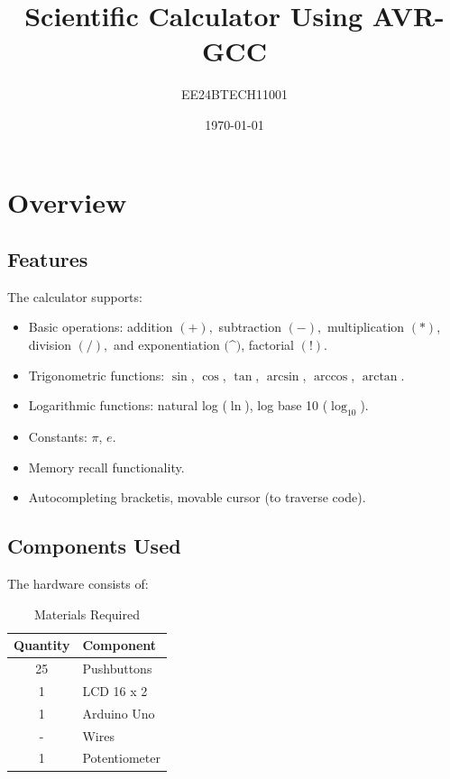 \documentclass[a4paper,12pt]{article}
\title{Scientific Calculator Using AVR-GCC}
\author{EE24BTECH11001}
\date{\today}
\begin{document}
\maketitle


\section{Overview}
\subsection{Features}
The calculator supports:
\begin{itemize}
    \item Basic operations: addition $(+),$ subtraction $(-),$ multiplication $(*)$, division $(/),$ and exponentiation $($\textasciicircum$)$, factorial $(!)$.
    \item Trigonometric functions: $\sin$, $\cos$, $\tan$, $\arcsin$, $\arccos$, $\arctan$.
    \item Logarithmic functions: natural log ($\ln$), log base 10 ($\log_{10}$).
    \item Constants: $\pi$, $e$.
    \item Memory recall functionality.
    \item Autocompleting bracketis, movable cursor (to traverse code).
\end{itemize}
\subsection*{Components Used}


The hardware consists of:
\begin{table}[H]
\centering
\begin{tabular}{|c|l|}
\hline
\textbf{Quantity} & \textbf{Component} \\
\hline
25 & Pushbuttons \\
\hline
1 & LCD 16 x 2 \\
\hline
1 & Arduino Uno\\
\hline
- & Wires \\
\hline
1 & Potentiometer \\
\hline
\end{tabular}
\caption{Materials Required}
\label{tab:materials}
\end{table}
\end{document}
